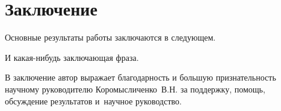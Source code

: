 \chapter*{Заключение}                       %


Основные результаты работы заключаются в следующем.

И какая-нибудь заключающая фраза.

В заключение автор выражает благодарность и большую признательность научному руководителю
Коромысличенко~В.\:Н. за поддержку, помощь, обсуждение результатов и~научное руководство.
